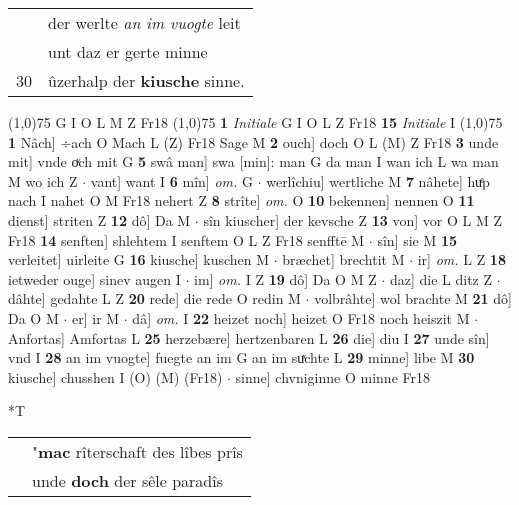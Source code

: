 \documentclass[8pt,a4paper,notitlepage]{article}
\begin{document}
\begin{table}[ht]
\begin{minipage}[t]{0.5\linewidth}
\begin{tabular}{rl}
 & der werlte \textit{an im vuogte} leit\\ 
 & unt daz er gerte minne\\ 
30 & ûzerhalp der \textbf{kiusche} sinne.\\ 
\end{tabular}
\scriptsize
\line(1,0){75} \newline
G I O L M Z Fr18 \newline
\line(1,0){75} \newline
\textbf{1} \textit{Initiale} G I O L Z Fr18  \textbf{15} \textit{Initiale} I  \newline
\line(1,0){75} \newline
\textbf{1} Nâch] ÷ach O Mach L (Z) Fr18 Sage M \textbf{2} ouch] doch O L (M) Z Fr18 \textbf{3} unde mit] vnde oͮch mit G \textbf{5} swâ man] swa [min]: man G da man I wan ich L wa man M wo ich Z  $\cdot$ vant] want I \textbf{6} mîn] \textit{om.} G  $\cdot$ werlîchiu] wertliche M \textbf{7} nâhete] huͤp nach I nahet O M Fr18 nehert Z \textbf{8} strîte] \textit{om.} O \textbf{10} bekennen] nennen O \textbf{11} dienst] striten Z \textbf{12} dô] Da M  $\cdot$ sîn kiuscher] der kevsche Z \textbf{13} von] vor O L M Z Fr18 \textbf{14} senften] shlehtem I senftem O L Z Fr18 senfftē M  $\cdot$ sîn] sie M \textbf{15} verleitet] uirleite G \textbf{16} kiusche] kuschen M  $\cdot$ bræchet] brechtit M  $\cdot$ ir] \textit{om.} L Z \textbf{18} ietweder ouge] sinev augen I  $\cdot$ im] \textit{om.} I Z \textbf{19} dô] Da O M Z  $\cdot$ daz] die L ditz Z  $\cdot$ dâhte] gedahte L Z \textbf{20} rede] die rede O redin M  $\cdot$ volbrâhte] wol brachte M \textbf{21} dô] Da O M  $\cdot$ er] ir M  $\cdot$ dâ] \textit{om.} I \textbf{22} heizet noch] heizet O Fr18 noch heiszit M  $\cdot$ Anfortas] Amfortas L \textbf{25} herzebære] hertzenbaren L \textbf{26} die] diu I \textbf{27} unde sîn] vnd I \textbf{28} an im vuogte] fuegte an im G an im suͯchte L \textbf{29} minne] libe M \textbf{30} kiusche] chusshen I (O) (M) (Fr18)  $\cdot$ sinne] chvniginne O minne Fr18 \newline
\end{minipage}
\hspace{0.5cm}
\begin{minipage}[t]{0.5\linewidth}
\small
\begin{center}*T
\end{center}
\begin{tabular}{rl}
 & "\textbf{mac} rîterschaft des lîbes prîs\\ 
 & unde \textbf{doch} der sêle paradîs\\ 

\end{tabular}
\end{minipage}
\end{table}
\end{document}
